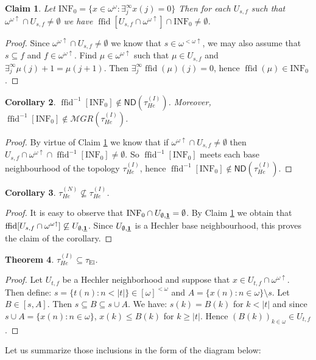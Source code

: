 \documentclass[12pt]{amsart}
\theoremstyle{plain}
\newtheorem{theorem}{Theorem}[section]
\newtheorem{corollary}[theorem]{Corollary}
\newtheorem{claim}[theorem]{Claim}
\theoremstyle{definition}
\theoremstyle{remark}
\newcommand{\baire}{\omega^{\omega}}
\newcommand{\finsub}{[\omega]^{<\omega}}
\newcommand{\finincrbaire}{\omega^{< \omega \uparrow}}
\newcommand{\incrbaire}{\omega^{\omega \uparrow}}
\newcommand{\meager}{{\mathcal MGR}}
\newcommand{\ND}{\mathsf{ND}}
\newcommand{\EllentuckTopology}{\tau_\mathrm{El}}
\newcommand{\Hechler}[2]{U_{#1,#2}}
\newcommand{\HechlerNative}{\tau_{\mathit{He}}^{(N)}}
\newcommand{\HechlerInduced}{\tau_{\mathit{He}}^{(I)}}
\DeclareMathOperator{\ffid}{ffid}
\newcommand{\INFZero}{\mathrm{INF}_0}
\begin{document}
\begin{claim}
  \label{claim:about-inf-0}
  Let $\INFZero = \lbrace x \in \baire\colon \exists_j^\infty x(j) = 0\rbrace$
Then for each $\Hechler{s}{f}$ such that
$\incrbaire \cap \Hechler{s}{f} \not= \emptyset$
we have
$\ffid[\Hechler{s}{f} \cap \incrbaire] \cap \INFZero \not= \emptyset$.
\end{claim}
\begin{proof}
  Since $\incrbaire \cap \Hechler{s}{f} \not= \emptyset$
we know that $s \in \finincrbaire$, we may also assume that
$s \subseteq f$ and $f \in \incrbaire$. Find $\mu \in \incrbaire$
such that $\mu \in \Hechler{s}{f}$ and
$\exists_j^\infty \mu(j) + 1 = \mu(j + 1)$.
Then $\exists_j^\infty \ffid(\mu)(j) = 0$,
hence $\ffid(\mu) \in \INFZero$.
\end{proof}

\begin{corollary}
  $\ffid^{-1}[\INFZero] \not\in \ND(\HechlerInduced)$. Moreover,
  $\ffid^{-1}[\INFZero] \not\in \meager(\HechlerInduced)$.
\end{corollary}

\begin{proof}
  By virtue of Claim \ref{claim:about-inf-0}
we know that if   
$\incrbaire \cap \Hechler{s}{f} \not= \emptyset$
then
$\Hechler{s}{f} \cap \incrbaire \cap \ffid^{-1}[\INFZero] \not= \emptyset$.
So $\ffid^{-1}[\INFZero]$ meets each base neighbourhood of the
topology $\HechlerInduced$, hence 
$\ffid^{-1}[\INFZero] \not\in \ND(\HechlerInduced)$.
\end{proof}

\begin{corollary}
$\HechlerNative \not\subseteq \HechlerInduced$.
\end{corollary}

\begin{proof}
It is easy to observe that 
$\INFZero \cap \Hechler{\emptyset}{\underline{\bf 1}} = \emptyset$.
By Claim \ref{claim:about-inf-0} we obtain that
$\ffid[\Hechler{s}{f} \cap \incrbaire] \not\subseteq \Hechler{\emptyset}{\underline{\bf 1}}$.
Since $\Hechler{\emptyset}{\underline{\bf 1}}$ is a Hechler base neighbourhood,
this proves the claim of the corollary.
\end{proof}

\begin{theorem}\label{thm:Hechler-induced-Ellentuck}
$\HechlerInduced \subseteq \EllentuckTopology$.
\end{theorem}
\begin{proof}
  Let $\Hechler{t}{f}$ be a Hechler neighborhood and suppose
  that $x \in \Hechler{t}{f} \cap \incrbaire$. Then
  define: $s = \lbrace t(n) \colon n < |t|\rbrace \in \finsub$
  and $A = \lbrace x(n) \colon n \in \omega\rbrace \setminus s$.
  Let $B \in [s,A]$. Then $s \subseteq B \subseteq s \cup A$.
  We have: $s(k) = B(k)$ for $k < |t|$ and since
  $s \cup A = \lbrace x(n) \colon n \in \omega\rbrace$,
  $x(k) \leq B(k)$ for $k \geq |t|$. Hence
  $(B(k))_{k\in\omega} \in \Hechler{t}{f}$.
\end{proof}  
Let us summarize those inclusions in the
form of the diagram below:
\end{document}
